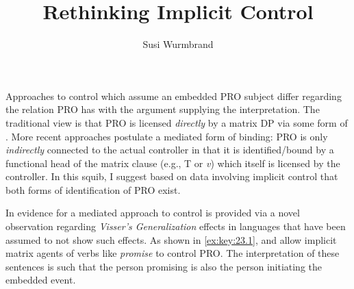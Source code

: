 \documentclass[output=paper]{langsci/langscibook}
\author{Susi Wurmbrand\affiliation{University of Vienna}}
\title{Rethinking Implicit Control}
\begin{document}
\glsresetall
\maketitle

\noindent Approaches to control which assume an embedded PRO subject differ
regarding the relation PRO has with the argument supplying the interpretation.
The traditional view is that PRO is licensed \emph{directly} by a matrix DP via
some form of . More recent approaches postulate a mediated form of
binding: PRO is only \emph{indirectly} connected to the actual controller in
that it is identified/bound by a functional head of the matrix clause (e.g., T
or \emph{v}) which itself is licensed by the controller. In this squib, I
suggest based on data involving implicit control that both forms of
identification of PRO exist.

In \textcite{vanUrk2013} evidence for a mediated approach to control is
provided via a novel observation regarding \emph{Visser’s Generalization}
effects in languages that have been assumed to not show such effects. As shown
in \eqref{ex:key:23.1},  and  allow implicit matrix
agents of verbs like \emph{promise} to control PRO. The interpretation of these
sentences is such that the person promising is also the person initiating the
embedded event.\newpage
\end{document}

